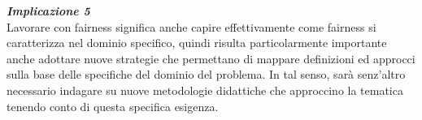 	
	 
	
	
	
	\begin{center}
	
        \begin{tcolorbox}[width=\textwidth, colframe=black, colback=perla]
    			\begin{minipage}{\textwidth}
    				\textit{\faCaretSquareORight  \textbf{ Implicazione 5}}\\
    		    Lavorare con fairness significa anche capire effettivamente come fairness si caratterizza nel dominio specifico, quindi risulta particolarmente importante anche adottare nuove strategie che permettano di mappare definizioni ed approcci sulla base delle specifiche del dominio del problema. In tal senso, sarà senz'altro necessario indagare su nuove metodologie didattiche che approccino la tematica tenendo conto di questa specifica esigenza.
    			\end{minipage}
		\end{tcolorbox}
	\end{center}
\newpage
